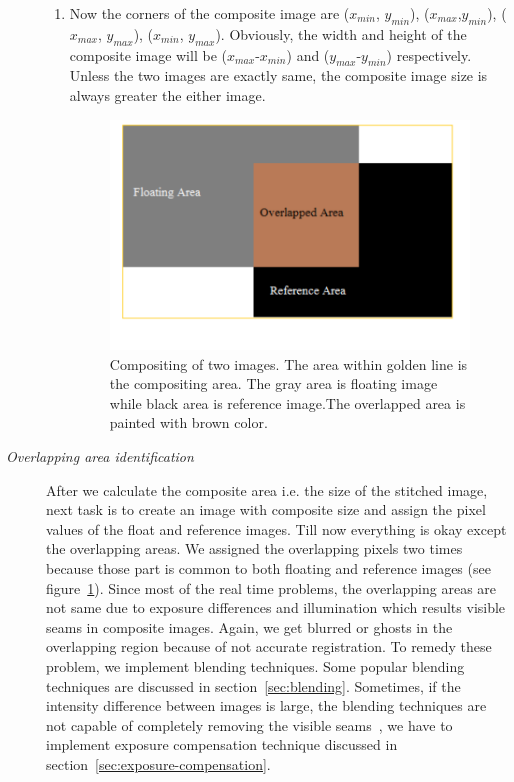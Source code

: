 \begin{description}
\begin{enumerate}
	\item Now the corners of the composite image are  {($x_{min}$, $y_{min}$), ($x_{max}$,$y_{min}$), ($x_{max}$, $y_{max}$), ($x_{min}$, $y_{max}$)}. Obviously, the width and height of the composite image will be ($x_{max}$-$x_{min}$) and ($y_{max}$-$y_{min}$) respectively. Unless the two images are exactly same, the composite image size is always greater the either image.

\begin{figure}[H]%
  \centering
	\includegraphics[width=\columnwidth]{2.mainmatter/2.Methodology/figures/Compositing}%
	\caption[Compositing]{Compositing of two images. The area within golden line is the compositing area. The gray area is floating image while black area is reference image.The overlapped area is painted with brown color.}%
	\label{fig:compositing-area}%
\end{figure}

\end{enumerate}

\item [\emph{Overlapping area identification}]
After we calculate the composite area i.e. the size of the stitched image, next task is to create an image with composite size and assign the pixel values of the float and reference images. Till now everything is okay except the overlapping areas. We assigned the overlapping pixels two times because those part is common to both floating and reference images (see figure~\ref{fig:compositing-area}). Since most of the real time problems, the overlapping areas are not same due to exposure differences and illumination which results visible seams in composite images. Again, we get blurred or ghosts in the overlapping region because of not accurate registration. To remedy these problem, we implement blending techniques. Some popular blending techniques are discussed in section~\ref{sec:blending}. Sometimes, if the intensity difference between images is large, the blending techniques are not capable of completely removing the visible seams~\cite{Dubrofsky:07}, we have to implement exposure compensation technique discussed in section~\ref{sec:exposure-compensation}.


\end{description}
